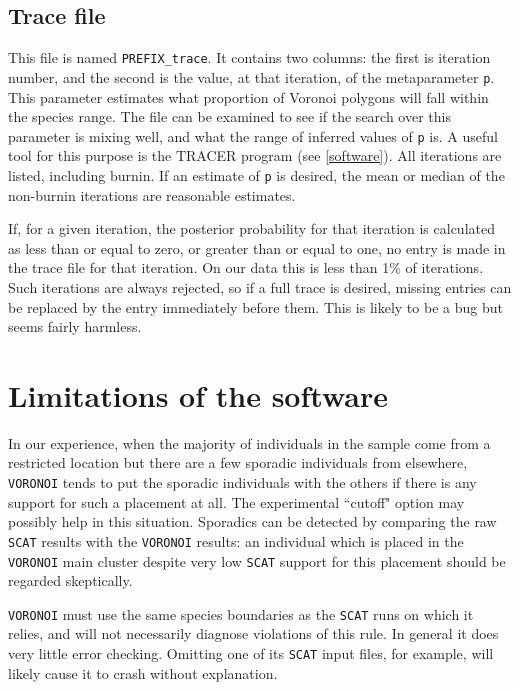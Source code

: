 \documentclass[10pt,titlepage,times,letterpaper]{article}
\def\SCAT{{\tt SCAT} }
\def\VORONOI{{\tt VORONOI} }
\begin{document}
\subsection{Trace file}

This file is named {\tt PREFIX\_trace}.  It contains two columns:  the first is iteration
number, and the second is the value, at that iteration, of the metaparameter {\tt p}.
This parameter estimates what proportion of Voronoi polygons will fall within the
species range.  The file can be examined to see if the search over this parameter is
mixing well, and what the range of inferred values of {\tt p} is.  A useful tool
for this purpose is the TRACER program (see \ref{software}).  All iterations are
listed, including burnin.  If an estimate of {\tt p} is desired, the mean or median of
the non-burnin iterations are reasonable estimates.

If, for a given iteration, the posterior probability for that iteration is calculated
as less than or equal to zero, or greater than or equal to one, no entry is made in the trace 
file for that iteration.
On our data this is less than 1\% of iterations.  Such iterations
are always rejected, so if a full trace is desired, missing entries can be replaced by
the entry immediately before them.  This is likely to be a bug but seems fairly
harmless.

\section{Limitations of the software} \label{limitations}

In our experience, when the majority of individuals in the sample come from a restricted
location but there are a few sporadic individuals from elsewhere, \VORONOI tends to put
the sporadic individuals with the others if there is any support for such a placement at
all.  The experimental ``cutoff" option may possibly help in this situation.   Sporadics
can be detected by comparing the raw \SCAT results with the \VORONOI results:  an individual
which is placed in the \VORONOI main cluster despite very low \SCAT support for this placement
should be regarded skeptically.

\VORONOI must use the same species boundaries as the \SCAT runs on which it relies, and
will not necessarily diagnose violations of this rule.  In general it does very little error
checking.  Omitting one of its \SCAT input files, for example, will likely cause it to
crash without explanation.
\end{document}
